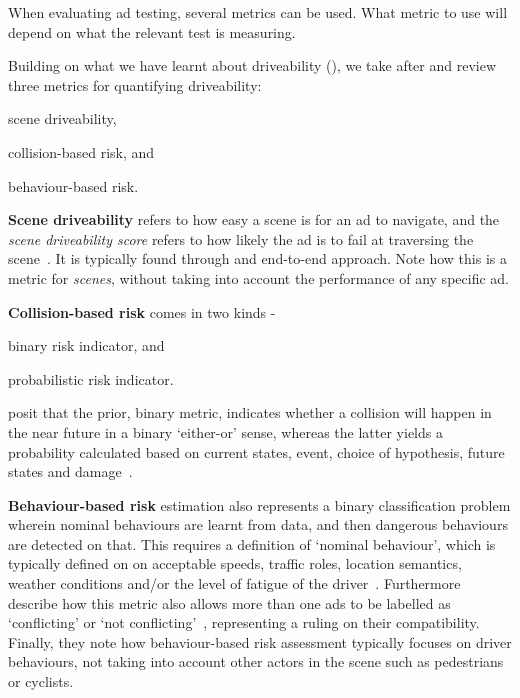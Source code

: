 When evaluating \acrshort{ad} testing, several metrics can be used. What metric to use will depend
on what the relevant test is measuring.

Building on what we have learnt about driveability (),
we take after \citeauthor{safeToDrive} and review three metrics for
quantifying driveability: \begin{inparaenum}
    \item scene driveability,
    \item collision-based risk, and
    \item behaviour-based risk.
\end{inparaenum}

\textbf{Scene driveability} refers to how easy a scene is for an
\acrshort{ad} to navigate, and the \textit{scene driveability score} refers to
how likely the \acrlong{ad} is to fail at traversing the
scene~\cite[3140]{safeToDrive}. It is typically found through and end-to-end
approach. Note how this is a metric for \textit{scenes}, without taking into
account the performance of any specific \acrshort{ad}.

\textbf{Collision-based risk} comes in two kinds - \begin{inparaenum}
    \item binary risk indicator, and
    \item probabilistic risk indicator.
\end{inparaenum} \citeauthor{safeToDrive} posit that the prior, binary metric, indicates whether a
collision will happen in the near future in a binary `either-or' sense, whereas the latter yields a
probability calculated based on current states, event, choice of hypothesis, future states and
damage~\cite[3140]{safeToDrive}.

\textbf{Behaviour-based risk} estimation also represents a binary classification problem wherein
nominal behaviours are learnt from data, and then dangerous behaviours are detected on that. This
requires a definition of `nominal behaviour', which is typically defined on on acceptable speeds,
traffic roles, location semantics, weather conditions and/or the level of fatigue of the
driver~\cite[3140]{safeToDrive}. Furthermore \citeauthor{safeToDrive} describe how this metric also
allows more than one \acrshort{ads} to be labelled as `conflicting' or `not
conflicting'~\cite[3140]{safeToDrive}, representing a ruling on their compatibility. Finally, they
note how behaviour-based risk assessment typically focuses on driver behaviours, not taking into
account other actors in the scene such as pedestrians or cyclists.

